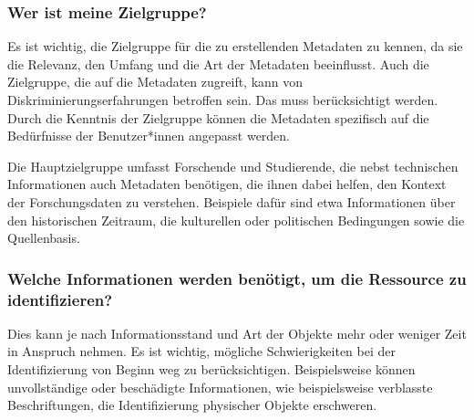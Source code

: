 \documentclass[
  nswissgerman,
  letterpaper,
  DIV=11,
  numbers=noendperiod]{scrartcl}
\begin{document}
\subsubsection{Wer ist meine
Zielgruppe?}\label{wer-ist-meine-zielgruppe}

Es ist wichtig, die Zielgruppe für die zu erstellenden Metadaten zu
kennen, da sie die Relevanz, den Umfang und die Art der Metadaten
beeinflusst. Auch die Zielgruppe, die auf die Metadaten zugreift, kann
von Diskriminierungserfahrungen betroffen sein. Das muss berücksichtigt
werden. Durch die Kenntnis der Zielgruppe können die Metadaten
spezifisch auf die Bedürfnisse der Benutzer*innen angepasst werden.

\begin{tcolorbox}[enhanced jigsaw, arc=.35mm, bottomrule=.15mm, bottomtitle=1mm, breakable, colback=white, colbacktitle=quarto-callout-tip-color!10!white, colframe=quarto-callout-tip-color-frame, coltitle=black, left=2mm, leftrule=.75mm, opacityback=0, opacitybacktitle=0.6, rightrule=.15mm, title=\textcolor{quarto-callout-tip-color}{\faLightbulb}\hspace{0.5em}{Erfahrungen der Stadt.Geschichte.Basel}, titlerule=0mm, toprule=.15mm, toptitle=1mm]

Die Hauptzielgruppe umfasst Forschende und Studierende, die nebst
technischen Informationen auch Metadaten benötigen, die ihnen dabei
helfen, den Kontext der Forschungsdaten zu verstehen. Beispiele dafür
sind etwa Informationen über den historischen Zeitraum, die kulturellen
oder politischen Bedingungen sowie die Quellenbasis.

\end{tcolorbox}

\subsubsection{Welche Informationen werden benötigt, um die Ressource zu
identifizieren?}\label{welche-informationen-werden-benuxf6tigt-um-die-ressource-zu-identifizieren}

Dies kann je nach Informationsstand und Art der Objekte mehr oder
weniger Zeit in Anspruch nehmen. Es ist wichtig, mögliche
Schwierigkeiten bei der Identifizierung von Beginn weg zu
berücksichtigen. Beispielsweise können unvollständige oder beschädigte
Informationen, wie beispielsweise verblasste Beschriftungen, die
Identifizierung physischer Objekte erschweren.
\end{document}
